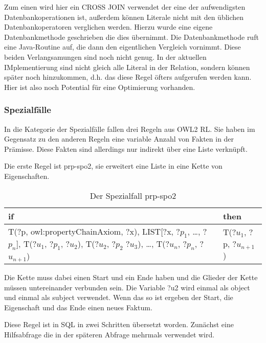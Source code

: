 Zum einen wird hier ein CROSS JOIN verwendet der eine der aufwendigsten Datenbankoperationen ist, außerdem können Literale nicht mit den üblichen Datenbankoperatoren verglichen werden. Hierzu wurde eine eigene Datenbankmethode geschrieben die dies übernimmt. Die Datenbankmethode ruft eine Java-Routine auf, die dann den eigentlichen Vergleich vornimmt. Diese beiden Verlangsamungen sind noch nicht genug. In der aktuellen IMplementierung sind nicht gleich alle Literal in der Relation, sondern können später noch hinzukommen, d.h. das diese Regel öfters aufgerufen werden kann. Hier ist also noch Potential für eine Optimierung vorhanden.


\subsubsection{Spezialfälle} 
In die Kategorie der Spezialfälle fallen drei Regeln aus OWL2 RL. Sie haben im Gegensatz zu den anderen Regeln eine variable Anzahl von Fakten in der Prämisse. Diese Fakten sind allerdings nur indirekt über eine Liste verknüpft.

Die erste Regel ist prp-spo2, sie erweitert eine Liste in eine Kette von Eigenschaften.
\begin{table}[htb]
\begin{center}
	\begin{tabular}{m{6cm}|m{3cm}}
	if & then \\ \hline
	T(?p, owl:propertyChainAxiom, ?x),\newline
	LIST[?x, ?$p_1$, \ldots, ?$p_n$],\newline
	T(?$u_1$, ?$p_1$, ?$u_2$),\newline
	T(?$u_2$, ?$p_2$ ?$u_3$),\newline
	\ldots,\newline
	T(?$u_n$, ?$p_n$, ?$u_{n+1}$) & T(?$u_1$, ?p, ?$u_{n+1}$)
	\end{tabular}
\end{center}
	\caption{Der Spezialfall prp-spo2}
	\label{rule-prp-spo2}
\end{table}

Die Kette muss dabei einen Start und ein Ende haben und die Glieder der Kette müssen untereinander verbunden sein. Die Variable ?u2 wird einmal als object und einmal als subject verwendet. Wenn das so ist ergeben der Start, die Eigenschaft und das Ende einen neues Faktum.

Diese Regel ist in SQL in zwei Schritten übersetzt worden. Zunächst eine Hilfsabfrage die in der späteren Abfrage mehrmals verwendet wird.

